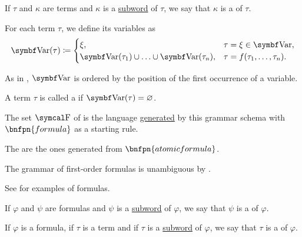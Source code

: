 \begin{definition}
\begin{DefEnum}
     If \( \tau \) and \( \kappa \) are terms and \( \kappa \) is a \hyperref[def:language/subword]{subword} of \( \tau \), we say that \( \kappa \) is a  of \( \tau \).

     For each term \( \tau \), we define its variables as
    \begin{equation}\label{eq:def:first_order_syntax/term_variables}
      \Bold{Var}(\tau) \coloneqq \begin{cases}
        \xi,                                                    &\tau = \xi \in \Bold{Var},        \\
        \Bold{Var}(\tau_1) \cup \ldots \cup \Bold{Var}(\tau_n), &\tau = f(\tau_1, \ldots, \tau_n).
      \end{cases}
    \end{equation}

    As in , \( \Bold{Var} \) is ordered by the position of the first occurrence of a variable.

     A term \( \tau \) is called a  if \( \Bold{Var}(\tau) = \varnothing \).

     The set \( \CF \) of  is the language \hyperref[def:grammar_derivation/grammar_language]{generated} by this grammar schema with \( \bnfpn{formula} \) as a starting rule.

    The  are the ones generated from \( \bnfpn{atomic formula} \).

    The grammar of first-order formulas is unambiguous by .

    See  for examples of formulas.

     If \( \varphi \) and \( \psi \) are formulas and \( \psi \) is a \hyperref[def:language/subword]{subword} of \( \varphi \), we say that \( \psi \) is a  of \( \varphi \).

     If \( \varphi \) is a formula, if \( \tau \) is a term and if \( \tau \) is a \hyperref[def:language/subword]{subword} of \( \varphi \), we say that \( \tau \) is a  of \( \varphi \).


\end{DefEnum}
\end{definition}
